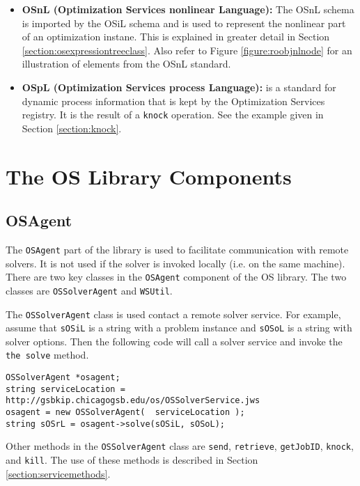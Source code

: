 \documentclass[11pt]{article}
\newcounter{Fig}
\renewcommand{\_}{{\char"5F}}
\renewcommand{\{}{{\char"7B}}
\renewcommand{\}}{{\char"7D}}
\renewcommand{\^}{{\char"0D}}
\renewcommand{\'}{{\char"0D}}
\begin{document}
\begin{itemize}
\item[] {\bf OSnL (Optimization Services nonlinear Language):}  The OSnL schema is imported by the OSiL schema and is used to represent the nonlinear part of an optimization instane. This is explained in greater detail in Section \ref{section:osexpressiontreeclass}. Also refer to Figure \ref{figure:roobjnlnode} for an illustration of elements from the OSnL standard.



\item[]   {\bf OSpL (Optimization Services process Language):} is a standard for dynamic process information that is kept by the Optimization Services registry.
It is the result of a {\tt knock} operation. See the example given in Section \ref{section:knock}.

\end{itemize}




\section{The OS Library Components}\label{section:oslibrary}

\subsection{OSAgent}\label{section:osagent}

The {\tt OSAgent}  part of the library is used to facilitate communication with remote solvers. It is not used if the solver is invoked locally (i.e. on the same machine).   There are two key classes in the {\tt OSAgent} component of the OS library. The two classes are {\tt OSSolverAgent} and {\tt WSUtil}.

The {\tt OSSolverAgent} class is used  contact a remote solver service.  For example, assume that {\tt sOSiL} is a string with a problem instance and {\tt sOSoL} is a string with solver options. Then the following code will call a solver service and invoke the {\tt the solve} method.
\begin{verbatim}
OSSolverAgent *osagent;
string serviceLocation = http://gsbkip.chicagogsb.edu/os/OSSolverService.jws
osagent = new OSSolverAgent(  serviceLocation );
string sOSrL = osagent->solve(sOSiL, sOSoL);
\end{verbatim}
Other methods in the {\tt OSSolverAgent} class are {\tt send}, {\tt retrieve}, {\tt getJobID}, {\tt knock}, and {\tt kill}.  The use of these methods is described in Section \ref{section:servicemethods}.
\end{document}
